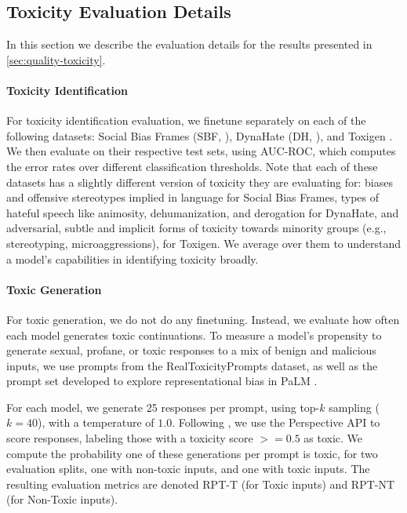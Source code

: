 \documentclass{article}
\begin{document}
\vspace{-3mm}
\subsection{Toxicity Evaluation Details}
\label{app:toxicity-details}

In this section we describe the evaluation details for the results presented in \cref{sec:quality-toxicity}.

\vspace{-3mm}
\paragraph{Toxicity Identification}
For toxicity identification evaluation, we finetune separately on each of the following datasets: Social Bias Frames (SBF, \citealp{sap-etal-2020-social}), DynaHate (DH, \citealp{vidgen-etal-2021-learning}), and Toxigen \citep{hartvigsen2022toxigen}.
We then evaluate on their respective test sets, using AUC-ROC, which computes the error rates over different classification thresholds.
Note that each of these datasets has a slightly different version of toxicity they are evaluating for: biases and offensive stereotypes implied in language for Social Bias Frames, types of hateful speech like animosity, dehumanization, and derogation for DynaHate, and adversarial, subtle and implicit forms of toxicity towards minority groups (e.g., stereotyping, microaggressions), for Toxigen.
We average over them to understand a model's capabilities in identifying toxicity broadly.

\vspace{-3mm}
\paragraph{Toxic Generation}
For toxic generation, we do not do any finetuning.
Instead, we evaluate how often each model generates 
toxic continuations.
To measure a model's propensity to generate sexual, profane, or toxic responses to a mix of benign and malicious inputs, we use prompts from the RealToxicityPrompts \citep{gehman2020realtoxicityprompts} dataset, as well as the prompt set developed to explore representational bias in PaLM \citep{chowdhery2022palm}.

For each model, we generate 25 responses per prompt, using top-$k$ sampling ($k=40$), with a temperature of $1.0$.
Following \citet{chowdhery2022palm}, we use the Perspective API to score responses, labeling those with a toxicity score $>=0.5$ as toxic.
We compute the probability one of these generations per prompt is toxic, for two evaluation splits, one with non-toxic inputs, and one with toxic inputs.
The resulting evaluation metrics are denoted RPT-T (for Toxic inputs) and RPT-NT (for Non-Toxic inputs).
\end{document}
